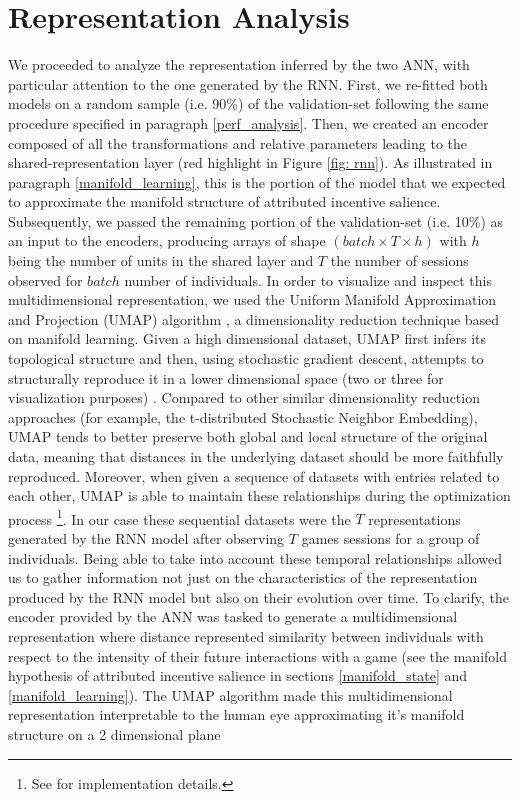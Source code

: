 \section{Representation Analysis}
\label{representation_analysis}
We proceeded to analyze the representation inferred by the two ANN, with particular attention to the one generated by the RNN. First, we re-fitted both models on a random sample (i.e. 90\%) of the validation-set following the same procedure specified in paragraph \ref{perf_analysis}. Then, we created an encoder composed of all the transformations and relative parameters leading to the shared-representation layer (red highlight in Figure \ref{fig: rnn}). As illustrated in paragraph \ref{manifold_learning}, this is the portion of the model that we expected to approximate the manifold structure of attributed incentive salience. Subsequently, we passed the remaining portion of the validation-set (i.e. 10\%) as an input to the encoders, producing arrays of shape $(batch\times T \times h)$ with $h$ being the number of units in the shared layer and $T$ the number of sessions observed for $batch$ number of individuals. In order to visualize and inspect this multidimensional representation, we used the Uniform Manifold Approximation and Projection (UMAP) algorithm \cite{2018arXivUMAP}, a dimensionality reduction  technique based on manifold learning. Given a high dimensional dataset, UMAP first infers its topological structure and then, using stochastic gradient descent, attempts to structurally reproduce it in a lower dimensional space (two or three for visualization purposes) \cite{2018arXivUMAP}. Compared to other similar dimensionality reduction approaches (for example, the t-distributed Stochastic Neighbor Embedding), UMAP tends to better preserve both global and local structure of the original data, meaning that distances in the underlying dataset should be more faithfully reproduced. Moreover, when given a sequence of datasets with entries related to each other, UMAP is able to maintain these relationships during the optimization process \footnote{See \cite{alignedumap} for implementation details.}. In our case these sequential datasets were the $T$ representations generated by the RNN model after observing $T$ games sessions for a group of individuals. Being able to take into account these temporal relationships allowed us to gather information not just on the characteristics of the representation produced by the RNN model but also on their evolution over time. To clarify, the encoder provided by the ANN was tasked to generate a multidimensional representation where distance represented similarity between individuals with respect to the intensity of their future interactions with a game (see the manifold hypothesis of attributed incentive salience in sections \ref{manifold_state} and \ref{manifold_learning}). The UMAP algorithm made this multidimensional representation interpretable to the human eye approximating it's manifold structure on a 2 dimensional plane 
